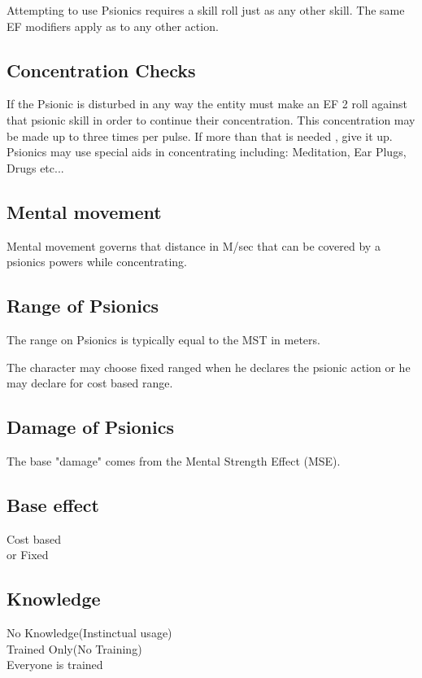 Attempting to use Psionics requires a skill roll just as any other skill.
The same EF modifiers apply as to any other action. 

\subsection{Concentration Checks}

If the Psionic is disturbed in any way the entity must make an EF 2 roll
against that psionic skill in order to continue their concentration. This
concentration may be made up to three times per pulse. If more than that is
needed , give it up. Psionics may use special aids in concentrating including: 
Meditation, Ear Plugs, Drugs etc...

\subsection{Mental movement}

Mental movement governs that distance in M/sec that can be covered by 
a psionics powers while concentrating.

\subsection{Range of Psionics}

The range on Psionics is typically equal to the MST in meters.

The character may choose fixed ranged when he declares the psionic 
action or he may declare for cost based range. 

\subsection{Damage of Psionics}

The base "damage" comes from the Mental Strength Effect (MSE).

\subsection{Base effect}

Cost based \\
or Fixed\\

\subsection{Knowledge}

No Knowledge(Instinctual usage) \\
Trained Only(No Training) \\
Everyone is trained \\

